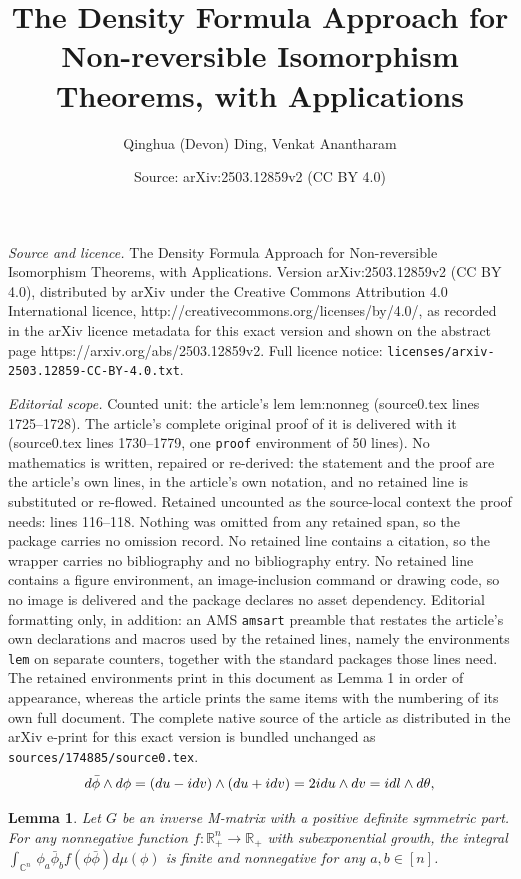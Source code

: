 \documentclass[10pt,a4paper]{amsart}
\title{The Density Formula Approach for Non-reversible Isomorphism Theorems, with Applications}
\author{Qinghua (Devon) Ding, Venkat Anantharam}
\date{Source: arXiv:2503.12859v2 (CC BY 4.0)}
\newtheorem{lem}{Lemma}
\newcommand{\compi}{\textnormal{i}}
\begin{document}
\maketitle

\noindent\emph{Source and licence.} The Density Formula Approach for Non-reversible Isomorphism Theorems, with Applications. Version arXiv:2503.12859v2 (CC BY 4.0), distributed by arXiv under the Creative Commons Attribution 4.0 International licence, http://creativecommons.org/licenses/by/4.0/, as recorded in the arXiv licence metadata for this exact version and shown on the abstract page https://arxiv.org/abs/2503.12859v2. Full licence notice: \texttt{licenses/arxiv-2503.12859-CC-BY-4.0.txt}.\par\smallskip

\noindent\textit{Editorial scope.} Counted unit: the article's lem lem:nonneg (source0.tex lines 1725--1728). The article's complete original proof of it is delivered with it (source0.tex lines 1730--1779, one \texttt{proof} environment of 50 lines). No mathematics is written, repaired or re-derived: the statement and the proof are the article's own lines, in the article's own notation, and no retained line is substituted or re-flowed.  Retained uncounted as the source-local context the proof needs: lines 116--118.  Nothing was omitted from any retained span, so the package carries no omission record.  No retained line contains a citation, so the wrapper carries no bibliography and no bibliography entry.  No retained line contains a figure environment, an image-inclusion command or drawing code, so no image is delivered and the package declares no asset dependency.  Editorial formatting only, in addition: an AMS \texttt{amsart} preamble that restates the article's own declarations and macros used by the retained lines, namely the environments \texttt{lem} on separate counters, together with the standard packages those lines need.  The retained environments print in this document as Lemma 1 in order of appearance, whereas the article prints the same items with the numbering of its own full document.  The complete native source of the article as distributed in the arXiv e-print for this exact version is bundled unchanged as \texttt{sources/174885/source0.tex}.
\begin{equation}        \label{eq:diffform}
d \bar{\phi} \wedge d \phi = (du - \compi dv) \wedge (du + \compi dv) = 2 \compi du \wedge dv = \compi dl \wedge d\theta,
\end{equation}

\vspace{.3em} \begin{lem}
\label{lem:nonneg}
Let $G$ be an inverse M-matrix with a positive definite symmetric part. For any nonnegative function $f:\mathbb{R}_+^n\rightarrow \mathbb{R}_+$ with subexponential growth, the integral $\int_{\mathbb{C}^n}\, \phi_a\bar{\phi}_b f(\phi\bar{\phi}) d\mu(\phi)$ is finite and nonnegative for any $a,b\in [n]$.
\end{lem}
\end{document}
